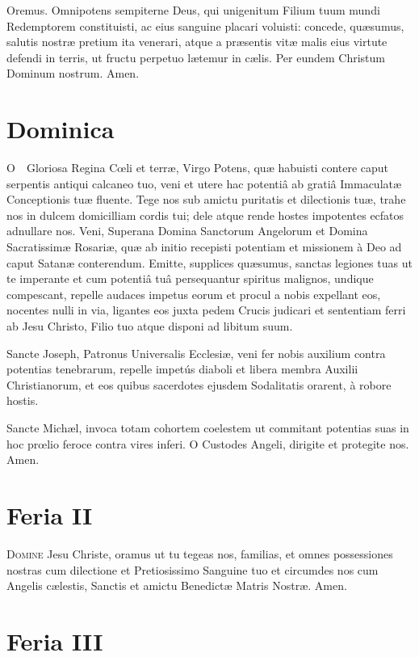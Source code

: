 \documentclass[9pt, twoside]{book}
\begin{document}
\noindent Oremus.
Omnipotens sempiterne Deus, qui unigenitum Filium tuum mundi Redemptorem constituisti, ac eius sanguine placari voluisti: concede, quæsumus, salutis nostræ pretium ita venerari, atque a præsentis vitæ malis eius virtute defendi in terris, ut fructu perpetuo lætemur in cælis. Per eundem Christum Dominum nostrum. Amen. 

\vfill
\section{Dominica}

\lettrine{O}\ \ Gloriosa Regina Cœli et terræ, Virgo Potens, quæ habuisti contere caput serpentis antiqui calcaneo tuo, veni et utere hac potentiâ ab gratiâ Immaculatæ Conceptionis tuæ fluente. Tege nos sub amictu puritatis et dilectionis tuæ, trahe nos in dulcem domicilliam cordis tui; dele atque rende hostes impotentes ecfatos adnullare nos. Veni, Superana Domina Sanctorum Angelorum et Domina Sacratissimæ Rosariæ, quæ ab initio recepisti potentiam et missionem à Deo ad caput Satanæ conterendum. Emitte, supplices quæsumus, sanctas legiones tuas ut te imperante et cum potentiâ tuâ persequantur spiritus malignos, undique compescant, repelle audaces impetus eorum et procul a nobis expellant eos, nocentes nulli in via, ligantes eos juxta pedem Crucis judicari et sententiam ferri ab Jesu Christo, Filio tuo atque disponi ad libitum suum.

\clearpage

Sancte Joseph, Patronus Universalis Ecclesiæ, veni fer nobis auxilium contra potentias tenebrarum, repelle impetús diaboli et libera membra Auxilii Christianorum, et eos quibus sacerdotes ejusdem Sodalitatis orarent, à robore hostis.

Sancte Michæl, invoca totam cohortem coelestem ut commitant potentias suas in hoc prœlio feroce contra vires inferi. O Custodes Angeli, dirigite et protegite nos. Amen.

\vfill
\section{Feria II}

\lettrine{D}{omine} Jesu Christe, oramus ut tu tegeas nos, familias, et omnes
possessiones nostras cum dilectione et Pretiosissimo Sanguine tuo et
circumdes nos cum Angelis cælestis, Sanctis et amictu Benedictæ Matris
Nostræ. Amen. 

\vfill
\section{Feria III}
\end{document}
